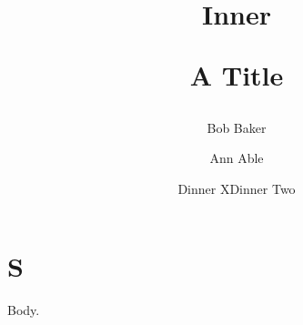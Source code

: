 \documentclass{article}
\begin{document}
\title{A Title \author{Ann Able \title{Inner \author{Bob Baker \date{Dinner X}}}}}
\date{Dinner Two}
\maketitle
\section{S}
Body.
\end{document}
